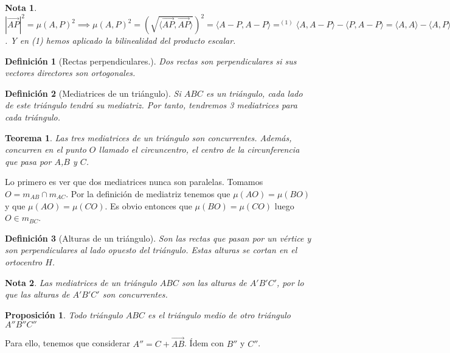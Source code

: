 \documentclass[11pt, a4paper]{article}
\makeatletter
\newif\IfInSansMode
\let\oldsf\sffamily
\renewcommand*{\sffamily}{\oldsf\mathversion{sans}\InSansModetrue}
\let\oldnorm\normalfont
\renewcommand*{\normalfont}{\oldnorm\InSansModefalse\mathversion{normal}}
\renewenvironment{proof}[1][\proofname] {\vspace{-15pt}\par\pushQED{\qed}\normalfont\topsep6\p@\@plus6\p@\relax\trivlist\item[\hskip\labelsep\it#1\@addpunct{.}]\ignorespaces}{\popQED\endtrivlist\@endpefalse}
\renewcommand{\vec}{\overrightarrow}
\renewenvironment{proof}[1][\proofname] {\par\pushQED{\qed}\normalfont\topsep6\p@\@plus6\p@\relax\trivlist\item[\hskip\labelsep\itshape\sffamily#1\@addpunct{.}]\ignorespaces}{\popQED\endtrivlist\@endpefalse}
\theoremstyle{theorem-style}
\newtheorem{nth}{Teorema}[section]
\newtheorem{nprop}{Proposición}[section]
\theoremstyle{definition-style}
\newtheorem{ndef}{Definición}[section]
\theoremstyle{remark-style}
\newtheorem*{nota}{Nota}
\theoremstyle{example-style}
\makeatother
\begin{document}
\begin{nota}
  $|\vec{AP}|^2 = \mu(A,P)^2\implies \mu(A,P)^2 = 	\left(\sqrt{\langle \vec{AP},\vec{AP}\rangle }\right)^2 =  \langle A-P, A-P \rangle  =^{(1)} \langle A,A-P\rangle -\langle P,A-P\rangle  =  \langle A,A\rangle  - \langle A,P\rangle +\langle P,P\rangle - \langle P,A\rangle   = |A|^2+|P|^2-2 \langle P,A\rangle $. Y en (1) hemos aplicado la bilinealidad del producto escalar.
\end{nota}
\begin{ndef}[Rectas perpendiculares.]
  Dos rectas son perpendiculares si sus vectores directores son ortogonales.
\end{ndef}

\begin{ndef}[Mediatrices de un triángulo]
  Si $ABC$ es un triángulo, cada lado de este triángulo tendrá su mediatriz. Por tanto, tendremos 3 mediatrices para cada triángulo.
\end{ndef}

\begin{nth}
  Las tres mediatrices de un triángulo son concurrentes. Además, concurren en el punto $O$ llamado el circuncentro, el centro de la circunferencia que pasa por $A$,$B$ y $C$.
\end{nth}
\begin{proof}
  Lo primero es ver que dos mediatrices nunca son paralelas. Tomamos $O = m_{AB} \cap m_{AC}$. Por la definición de mediatriz tenemos que $\mu(AO) = \mu(BO)$ y que $\mu(AO) = \mu(CO)$. Es obvio entonces que $\mu(BO) = \mu(CO)$ luego $O \in m_{BC}$.
\end{proof}


\begin{ndef}[Alturas de un triángulo]
  Son las rectas que pasan por un vértice y son perpendiculares al lado opuesto del triángulo. Estas alturas se cortan en el ortocentro $H$.
\end{ndef}

\begin{nota}
  Las mediatrices de un triángulo $ABC$ son las alturas de $A'B'C'$, por lo que las alturas de $A'B'C'$ son concurrentes.
\end{nota}

\begin{nprop}
  Todo triángulo $ABC$ es el triángulo medio de otro triángulo $A''B''C''$
\end{nprop}
\begin{proof}
  Para ello, tenemos que considerar $A'' = C+ \vec{AB}$. Ídem con $B''$ y $C''$.
\end{proof}
\end{document}
